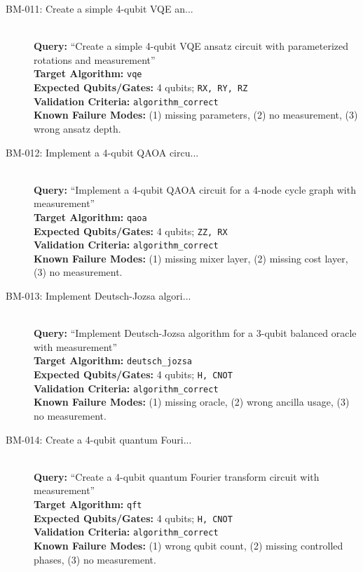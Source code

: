 \begin{description}
    \item[BM-011: Create a simple 4-qubit VQE an...] \ \\
    \textbf{Query:} ``Create a simple 4-qubit VQE ansatz circuit with parameterized rotations and measurement'' \\
    \textbf{Target Algorithm:} \texttt{vqe} \\
    \textbf{Expected Qubits/Gates:} 4 qubits; \texttt{RX, RY, RZ} \\
    \textbf{Validation Criteria:} \texttt{algorithm\_correct} \\
    \textbf{Known Failure Modes:} (1) missing parameters, (2) no measurement, (3) wrong ansatz depth.

    \item[BM-012: Implement a 4-qubit QAOA circu...] \ \\
    \textbf{Query:} ``Implement a 4-qubit QAOA circuit for a 4-node cycle graph with measurement'' \\
    \textbf{Target Algorithm:} \texttt{qaoa} \\
    \textbf{Expected Qubits/Gates:} 4 qubits; \texttt{ZZ, RX} \\
    \textbf{Validation Criteria:} \texttt{algorithm\_correct} \\
    \textbf{Known Failure Modes:} (1) missing mixer layer, (2) missing cost layer, (3) no measurement.

    \item[BM-013: Implement Deutsch-Jozsa algori...] \ \\
    \textbf{Query:} ``Implement Deutsch-Jozsa algorithm for a 3-qubit balanced oracle with measurement'' \\
    \textbf{Target Algorithm:} \texttt{deutsch\_jozsa} \\
    \textbf{Expected Qubits/Gates:} 4 qubits; \texttt{H, CNOT} \\
    \textbf{Validation Criteria:} \texttt{algorithm\_correct} \\
    \textbf{Known Failure Modes:} (1) missing oracle, (2) wrong ancilla usage, (3) no measurement.

    \item[BM-014: Create a 4-qubit quantum Fouri...] \ \\
    \textbf{Query:} ``Create a 4-qubit quantum Fourier transform circuit with measurement'' \\
    \textbf{Target Algorithm:} \texttt{qft} \\
    \textbf{Expected Qubits/Gates:} 4 qubits; \texttt{H, CNOT} \\
    \textbf{Validation Criteria:} \texttt{algorithm\_correct} \\
    \textbf{Known Failure Modes:} (1) wrong qubit count, (2) missing controlled phases, (3) no measurement.


\end{description}
